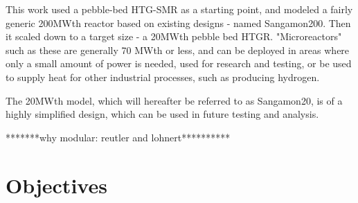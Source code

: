 This work used a pebble-bed HTG-SMR as a starting point, and modeled a fairly generic 200MWth reactor based on existing designs - named Sangamon200. Then it scaled down to a target size - a 20MWth pebble bed HTGR.  "Microreactors" such as these are generally 70 MWth or less, and can be deployed in areas where only a small amount of power is needed, used for research and testing, or be used to supply heat for other industrial processes, such as producing hydrogen.

The 20MWth model, which will hereafter be referred to as Sangamon20, is of a highly simplified design, which can be used in future testing and analysis.

*******why modular: reutler and lohnert**********

\section{Objectives}

